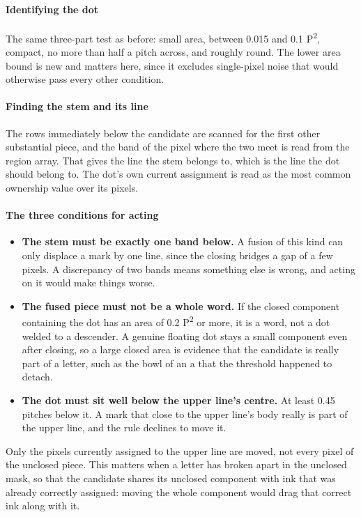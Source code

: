 \paragraph{Identifying the dot}
The same three-part test as before: small area, between 0.015 and 0.1 P\textsuperscript{2}, compact, no more than half a pitch across, and roughly round. The lower area bound is new and matters here, since it excludes single-pixel noise that would otherwise pass every other condition.


\paragraph{Finding the stem and its line}
The rows immediately below the candidate are scanned for the first other substantial piece, and the band of the pixel where the two meet is read from the region array. That gives the line the stem belongs to, which is the line the dot should belong to. The dot's own current assignment is read as the most common ownership value over its pixels.


\paragraph{The three conditions for acting}

\begin{itemize}\setlength\itemsep{0pt}
  \item \textbf{The stem must be exactly one band below.} A fusion of this kind can only displace a mark by one line, since the closing bridges a gap of a few pixels. A discrepancy of two bands means something else is wrong, and acting on it would make things worse.
  \item \textbf{The fused piece must not be a whole word.} If the closed component containing the dot has an area of 0.2 P\textsuperscript{2} or more, it is a word, not a dot welded to a descender. A genuine floating dot stays a small component even after closing, so a large closed area is evidence that the candidate is really part of a letter, such as the bowl of an a that the threshold happened to detach.
  \item \textbf{The dot must sit well below the upper line's centre.} At least 0.45 pitches below it. A mark that close to the upper line's body really is part of the upper line, and the rule declines to move it.
\end{itemize}
Only the pixels currently assigned to the upper line are moved, not every pixel of the unclosed piece. This matters when a letter has broken apart in the unclosed mask, so that the candidate shares its unclosed component with ink that was already correctly assigned: moving the whole component would drag that correct ink along with it.


